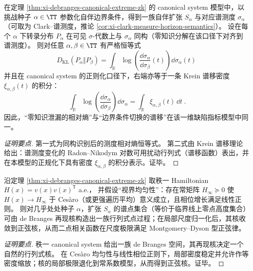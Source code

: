 \begin{proposition}\label{prop:xi-krein-spectral-shift-equals-kl}
在定理 \ref{thm:xi-debranges-canonical-extreme-zk} 的 canonical system 模型中，以挑战种子 \(\alpha\in\TT\) 参数化自伴边界条件，得到一族自伴扩张 \(S_\alpha\) 与对应谱测度 \(\sigma_\alpha\)（可取为 Clark–谱测度，推论 \ref{cor:xi-clark-measure-horizon-semantics}）。
设在每个 \(\alpha\) 下转录分布 \(P_\alpha\) 在可见 \(\sigma\)-代数上与 \(\sigma_\alpha\) 同构（零知识分解在该口径下对齐到谱测度）。
则对任意 \(\alpha,\beta\in\TT\) 有严格恒等式
\[
\boxed{\;
D_{\mathrm{KL}}(P_\alpha\Vert P_\beta)
=\int_{\mathbb{R}}\log\!\left(\frac{\dd\sigma_\alpha}{\dd\sigma_\beta}(t)\right)\dd\sigma_\alpha(t)\;}
\]
并且在 canonical system 的正则化口径下，右端亦等于一条 Krein 谱移密度 \(\xi_{\alpha,\beta}(t)\) 的积分：
\[
\boxed{\;
\int_{\mathbb{R}}\log\!\left(\frac{\dd\sigma_\alpha}{\dd\sigma_\beta}\right)\dd\sigma_\alpha
=\int_{\mathbb{R}}\xi_{\alpha,\beta}(t)\,\dd t\; }.
\]
因此，“零知识泄漏的相对熵”与“边界条件切换的谱移”在该一维缺陷指标模型中同一。
\end{proposition}
\begin{proof}[证明要点]
第一式为同构识别后的测度相对熵恒等式。
第二式由 Krein 谱移理论给出：谱测度变化的 Radon--Nikodym 对数可用扰动行列式（谱移函数）表出，并在本模型的正规化下具有密度 \(\xi_{\alpha,\beta}\) 的积分表示。证毕。
\end{proof}

\begin{proposition}\label{prop:xi-debranges-dpp-sine-kernel-limit}
沿定理 \ref{thm:xi-debranges-canonical-extreme-zk} 取秩一 Hamiltonian \(H(x)=v(x)v(x)^{\mathsf T}\) a.e.，
并假设“视界均匀性”：存在常矩阵 \(H_\infty\succeq 0\) 使 \(H(x)\to H_\infty\) 于 Ces\`aro（或更强遍历平均）意义成立，且相位增长满足线性正则。
则对几乎处处种子 \(\alpha\)，扩张 \(S_\alpha\) 的谱点集合（等价于临界线上零点高度集合）可由 de Branges 再现核构造出一族行列式点过程；在局部尺度归一化后，其核收敛到正弦核，从而二点相关函数在尺度极限满足 Montgomery--Dyson 型正弦律。
\end{proposition}
\begin{proof}[证明要点]
秩一 canonical system 给出一族 de Branges 空间，其再现核决定一个自然的行列式核。
在 Ces\`aro 均匀性与线性相位正则下，局部密度稳定并允许作等密度缩放；核的局部极限退化到常系数模型，从而得到正弦核。证毕。
\end{proof}

